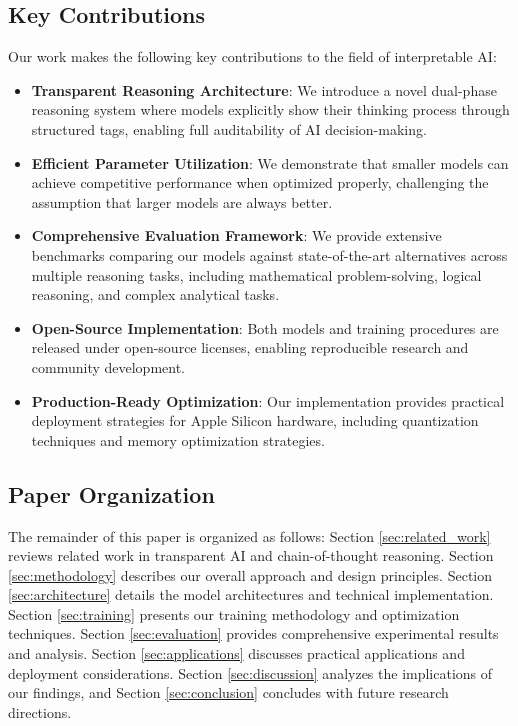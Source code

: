 \subsection{Key Contributions}

Our work makes the following key contributions to the field of interpretable AI:

\begin{itemize}
    \item \textbf{Transparent Reasoning Architecture}: We introduce a novel dual-phase reasoning system where models explicitly show their thinking process through structured tags, enabling full auditability of AI decision-making.
    
    \item \textbf{Efficient Parameter Utilization}: We demonstrate that smaller models can achieve competitive performance when optimized properly, challenging the assumption that larger models are always better.
    
    \item \textbf{Comprehensive Evaluation Framework}: We provide extensive benchmarks comparing our models against state-of-the-art alternatives across multiple reasoning tasks, including mathematical problem-solving, logical reasoning, and complex analytical tasks.
    
    \item \textbf{Open-Source Implementation}: Both models and training procedures are released under open-source licenses, enabling reproducible research and community development.
    
    \item \textbf{Production-Ready Optimization}: Our \mlx{} implementation provides practical deployment strategies for Apple Silicon hardware, including quantization techniques and memory optimization strategies.
\end{itemize}

\subsection{Paper Organization}

The remainder of this paper is organized as follows: Section \ref{sec:related_work} reviews related work in transparent AI and chain-of-thought reasoning. Section \ref{sec:methodology} describes our overall approach and design principles. Section \ref{sec:architecture} details the model architectures and technical implementation. Section \ref{sec:training} presents our training methodology and optimization techniques. Section \ref{sec:evaluation} provides comprehensive experimental results and analysis. Section \ref{sec:applications} discusses practical applications and deployment considerations. Section \ref{sec:discussion} analyzes the implications of our findings, and Section \ref{sec:conclusion} concludes with future research directions.